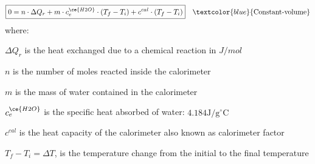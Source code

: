 \documentclass[main.tex]{subfiles}
\begin{document}
\begin{description}
%    
\begin{equation*}\begin{split}
\boxed{  0=n\cdot\Delta Q_{r}+m\cdot c_{e}^{\ce{H2O}}\cdot  (T_{f}-T_{i})   +c^{cal}\cdot  (T_{f}-T_{i})   } \quad \textcolor{blue}{\text{Constant-volume}}
\end{split}\end{equation*}
where:
\begin{where}
 \item $\Delta Q_{r}$   is the heat exchanged due to a chemical reaction in $J/mol$
  \item $n$   is the number of moles reacted inside the calorimeter
\item $m$ is the mass of water contained in the calorimeter 
 \item $c_{e}^{\ce{H2O}}$  is the specific heat absorbed of water: $4.184 \text{J}/\text{g}^{\circ}\text{C}$
  \item $c^{cal}$  is the heat capacity of the calorimeter also known as calorimeter factor
\item $T_{f}-T_{i}=\Delta T$, is the temperature change from the initial to the final temperature
\end{where}








\end{description}
\end{document}
